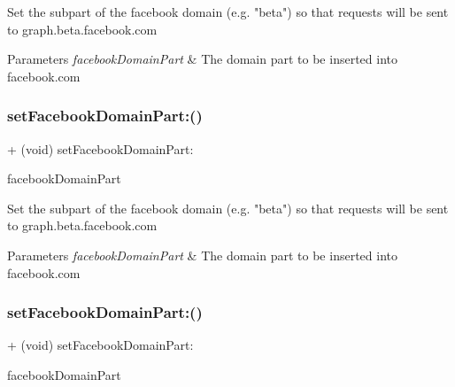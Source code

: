 Set the subpart of the facebook domain (e.\+g. "beta") so that requests will be sent to graph.\+beta.\+facebook.\+com


\begin{DoxyParams}{Parameters}
{\em facebook\+Domain\+Part} & The domain part to be inserted into facebook.\+com \\
\hline
\end{DoxyParams}
\mbox{\label{interfaceFBSettings_a4cfd61825c72f8a5978cb07ba84983d1}} 
\subsubsection{\texorpdfstring{set\+Facebook\+Domain\+Part\+:()}{setFacebookDomainPart:()}\hspace{0.1cm}{\footnotesize\ttfamily [2/5]}}
{\footnotesize\ttfamily + (void) set\+Facebook\+Domain\+Part\+: \begin{DoxyParamCaption}\item[{(N\+S\+String $\ast$)}]{facebook\+Domain\+Part }\end{DoxyParamCaption}}

Set the subpart of the facebook domain (e.\+g. "beta") so that requests will be sent to graph.\+beta.\+facebook.\+com


\begin{DoxyParams}{Parameters}
{\em facebook\+Domain\+Part} & The domain part to be inserted into facebook.\+com \\
\hline
\end{DoxyParams}
\mbox{\label{interfaceFBSettings_a4cfd61825c72f8a5978cb07ba84983d1}} 
\subsubsection{\texorpdfstring{set\+Facebook\+Domain\+Part\+:()}{setFacebookDomainPart:()}\hspace{0.1cm}{\footnotesize\ttfamily [3/5]}}
{\footnotesize\ttfamily + (void) set\+Facebook\+Domain\+Part\+: \begin{DoxyParamCaption}\item[{(N\+S\+String $\ast$)}]{facebook\+Domain\+Part }\end{DoxyParamCaption}}

